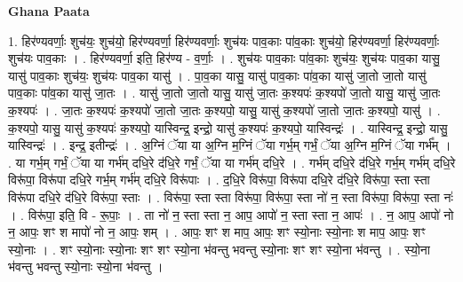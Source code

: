 \documentclass[17pt]{extarticle}
\begin{document}
\textbf{Ghana Paata } \newline

1. हिर॑ण्यवर्णाः॒ शुच॑यः॒ शुच॑यो॒ हिर॑ण्यवर्णा॒ हिर॑ण्यवर्णाः॒ शुच॑यः पाव॒काः पा॑व॒काः शुच॑यो॒ हिर॑ण्यवर्णा॒ हिर॑ण्यवर्णाः॒ शुच॑यः पाव॒काः । . हिर॑ण्यवर्णा॒ इति॒ हिर॑ण्य - व॒र्णाः॒ । . शुच॑यः पाव॒काः पा॑व॒काः शुच॑यः॒ शुच॑यः पाव॒का यासु॒ यासु॑ पाव॒काः शुच॑यः॒ शुच॑यः पाव॒का यासु॑ । . पा॒व॒का यासु॒ यासु॑ पाव॒काः पा॑व॒का यासु॑ जा॒तो जा॒तो यासु॑ पाव॒काः पा॑व॒का यासु॑ जा॒तः । . यासु॑ जा॒तो जा॒तो यासु॒ यासु॑ जा॒तः क॒श्यपः॑ क॒श्यपो॑ जा॒तो यासु॒ यासु॑ जा॒तः क॒श्यपः॑ । . जा॒तः क॒श्यपः॑ क॒श्यपो॑ जा॒तो जा॒तः क॒श्यपो॒ यासु॒ यासु॑ क॒श्यपो॑ जा॒तो जा॒तः क॒श्यपो॒ यासु॑ । . क॒श्यपो॒ यासु॒ यासु॑ क॒श्यपः॑ क॒श्यपो॒ यास्विन्द्र॒ इन्द्रो॒ यासु॑ क॒श्यपः॑ क॒श्यपो॒ यास्विन्द्रः॑ । . यास्विन्द्र॒ इन्द्रो॒ यासु॒ यास्विन्द्रः॑ । . इन्द्र॒ इतीन्द्रः॑ । . अ॒ग्निं ॅया या अ॒ग्नि म॒ग्निं ॅया गर्भ॒म् गर्भं॒ ॅया अ॒ग्नि म॒ग्निं ॅया गर्भ᳚म् । . या गर्भ॒म् गर्भं॒ ॅया या गर्भ॑म् दधि॒रे द॑धि॒रे गर्भं॒ ॅया या गर्भ॑म् दधि॒रे । . गर्भ॑म् दधि॒रे द॑धि॒रे गर्भ॒म् गर्भ॑म् दधि॒रे विरू॑पा॒ विरू॑पा दधि॒रे गर्भ॒म् गर्भ॑म् दधि॒रे विरू॑पाः । . द॒धि॒रे विरू॑पा॒ विरू॑पा दधि॒रे द॑धि॒रे विरू॑पा॒ स्ता स्ता विरू॑पा दधि॒रे द॑धि॒रे विरू॑पा॒ स्ताः । . विरू॑पा॒ स्ता स्ता विरू॑पा॒ विरू॑पा॒ स्ता नो॑ न॒ स्ता विरू॑पा॒ विरू॑पा॒ स्ता नः॑ । . विरू॑पा॒ इति॒ वि - रू॒पाः॒ । . ता नो॑ न॒ स्ता स्ता न॒ आप॒ आपो॑ न॒ स्ता स्ता न॒ आपः॑ । . न॒ आप॒ आपो॑ नो न॒ आपः॒ शꣳ श मापो॑ नो न॒ आपः॒ शम् । . आपः॒ शꣳ श माप॒ आपः॒ शꣳ स्यो॒नाः स्यो॒नाः श माप॒ आपः॒ शꣳ स्यो॒नाः । . शꣳ स्यो॒नाः स्यो॒नाः शꣳ शꣳ स्यो॒ना भ॑वन्तु भवन्तु स्यो॒नाः शꣳ शꣳ स्यो॒ना भ॑वन्तु । . स्यो॒ना भ॑वन्तु भवन्तु स्यो॒नाः स्यो॒ना भ॑वन्तु । \newline
\end{document}
